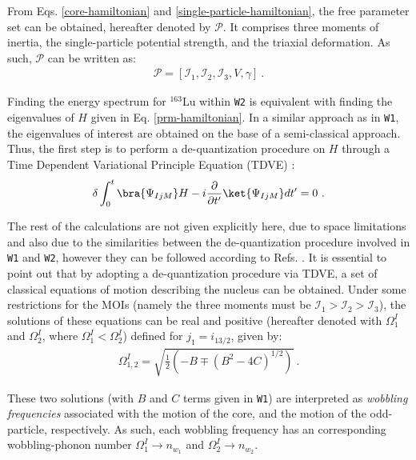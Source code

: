 \documentclass[myclassdoc,debug]{rjparticle}
\begin{document}
From Eqs. \ref{core-hamiltonian} and \ref{single-particle-hamiltonian}, the free parameter set can be obtained, hereafter denoted by $\mathcal{P}$. It comprises three moments of inertia, the single-particle potential strength, and the triaxial deformation. As such, $\mathcal{P}$ can be written as:
\begin{align}
    \mathcal{P}=\left[\mathcal{I}_1,\mathcal{I}_2,\mathcal{I}_3,V,\gamma\right]\ .
    \label{parameter-set}
\end{align}

Finding the energy spectrum for $^{163}$Lu within \texttt{W2} is equivalent with finding the eigenvalues of $H$ given in Eq. \ref{prm-hamiltonian}. In a similar approach as in \texttt{W1}, the eigenvalues of interest are obtained on the base of a semi-classical approach. Thus, the first step is to perform a de-quantization procedure on $H$ through a Time Dependent Variational Principle Equation (TDVE) \cite{raduta2007semiclassical,budaca2018tilted,raduta2017semiclassical,raduta2020new}:
\begin{align}
    \delta\int_0^t\bra{\Psi_{IjM}}H-i\frac{\partial}{\partial t'}\ket{\Psi_{IjM}}dt'=0\ .
    \label{tdve}
\end{align}

The rest of the calculations are not given explicitly here, due to space limitations and also due to the similarities between the de-quantization procedure involved in \texttt{W1} and \texttt{W2}, however they can be followed according to Refs. \cite{raduta2018wobbling,raduta2020approach,raduta2020towards}. It is essential to point out that by adopting a de-quantization procedure via TDVE, a set of classical equations of motion describing the nucleus can be obtained. Under some restrictions for the MOIs (namely the three moments must be $\mathcal{I}_1>\mathcal{I}_2>\mathcal{I}_3$), the solutions of these equations can be real and positive (hereafter denoted with $\Omega_1^I$ and $\Omega_2^I$, where $\Omega_1^I<\Omega_2^I$) defined for $j_1=i_{13/2}$, given by:
\begin{align}
    \Omega_{1,2}^I=\sqrt{\frac{1}{2}\left(-B\mp(B^2-4C)^{1/2}\right)}\ .
    \label{wobbling-frequencies}
\end{align}

These two solutions (with $B$ and $C$ terms given in \texttt{W1}) are interpreted as \emph{wobbling frequencies} associated with the motion of the core, and the motion of the odd-particle, respectively. As such, each wobbling frequency has an corresponding wobbling-phonon number $\Omega_1^I \to n_{w_1}$ and $\Omega_2^I \to n_{w_2}$.
\end{document}
